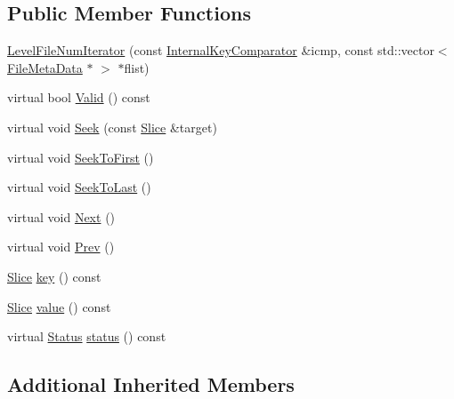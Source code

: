 \subsection*{Public Member Functions}
\begin{DoxyCompactItemize}
\item 
\hyperlink{classleveldb_1_1_version_1_1_level_file_num_iterator_a7d9b5b7c74d74974ae322d20535f112a}{Level\+File\+Num\+Iterator} (const \hyperlink{classleveldb_1_1_internal_key_comparator}{Internal\+Key\+Comparator} \&icmp, const std\+::vector$<$ \hyperlink{structleveldb_1_1_file_meta_data}{File\+Meta\+Data} $\ast$ $>$ $\ast$flist)
\item 
virtual bool \hyperlink{classleveldb_1_1_version_1_1_level_file_num_iterator_afb097a457cd972895393b3fbde7e2ad2}{Valid} () const 
\item 
virtual void \hyperlink{classleveldb_1_1_version_1_1_level_file_num_iterator_adbe855f4a783c2f578e1ff2fbb5259b2}{Seek} (const \hyperlink{classleveldb_1_1_slice}{Slice} \&target)
\item 
virtual void \hyperlink{classleveldb_1_1_version_1_1_level_file_num_iterator_a8e5d34bf0c1e17e83bbb9941821a7ee2}{Seek\+To\+First} ()
\item 
virtual void \hyperlink{classleveldb_1_1_version_1_1_level_file_num_iterator_ac7fafc33c049d1e33fdf9b5ae99f73d8}{Seek\+To\+Last} ()
\item 
virtual void \hyperlink{classleveldb_1_1_version_1_1_level_file_num_iterator_a7f470d4bd4dd27ff653bd1e61ccfd759}{Next} ()
\item 
virtual void \hyperlink{classleveldb_1_1_version_1_1_level_file_num_iterator_ab39c60a98d579590231034fdb665cb42}{Prev} ()
\item 
\hyperlink{classleveldb_1_1_slice}{Slice} \hyperlink{classleveldb_1_1_version_1_1_level_file_num_iterator_a8c2ee5f532fd05b2864f8d69d5c01f45}{key} () const 
\item 
\hyperlink{classleveldb_1_1_slice}{Slice} \hyperlink{classleveldb_1_1_version_1_1_level_file_num_iterator_ac09a8ed595aca29d90e6af91e80a4f00}{value} () const 
\item 
virtual \hyperlink{classleveldb_1_1_status}{Status} \hyperlink{classleveldb_1_1_version_1_1_level_file_num_iterator_a98bae41a244b6a5a6675a7f7b322281d}{status} () const 
\end{DoxyCompactItemize}
\subsection*{Additional Inherited Members}


